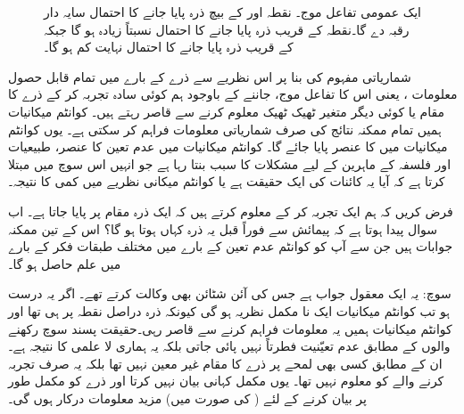 \begin{figure}
\centering
{}
\caption{
ایک عمومی تفاعل موج۔ نقطہ  اور  کے بیچ ذرہ پایا جانے کا احتمال سایہ دار رقبہ دے گا۔نقطہ  کے قریب ذرہ پایا جانے کا احتمال نسبتاً زیادہ ہو گا جبکہ  کے قریب ذرہ پایا جانے کا احتمال نہایت کم ہو گا۔
}
\label{شکل_تفاعل_موج_احتمال_اور_رقبہ}
\end{figure}
شماریاتی مفہوم کی بنا  پر اس نظریے سے  ذرے  کے بارے میں تمام قابل حصول معلومات ، یعنی اس کا تفاعل موج، جاننے  کے باوجود   ہم  کوئی سادہ تجربہ کر کے ذرے کا مقام یا کوئی دیگر متغیر ٹھیک ٹھیک معلوم کرنے سے قاصر رہتے ہیں۔ کوانٹم میکانیات ہمیں تمام ممکنہ نتائج کی  صرف شماریاتی معلومات فراہم کر سکتی ہے۔ یوں  کوانٹم میکانیات میں  کا عنصر پایا جائے گا۔ کوانٹم میکانیات میں عدم تعین کا عنصر،   طبیعیات اور فلسفہ کے ماہرین کے لیے مشکلات کا سبب بنتا رہا ہے جو انہیں اس سوچ   میں مبتلا کرتا  ہے  کہ آیا یہ کائنات کی ایک حقیقت ہے یا کوانٹم میکانی نظریے  میں کمی کا نتیجہ۔

 فرض کریں کہ ہم ایک تجربہ کر کے  معلوم کرتے ہیں کہ ایک ذرہ مقام  پر پایا جاتا ہے۔ اب سوال پیدا ہوتا ہے کہ پیمائش سے فوراً قبل یہ ذرہ کہاں ہوتا ہو گا؟ اس کے تین ممکنہ  جوابات ہیں جن سے آپ کو کوانٹم عدم تعین کے بارے میں مختلف طبقات فکر کے     بارے میں علم حاصل  ہو گا۔ 

\quad {}
 سوچ:    یہ ایک معقول جواب ہے جس کی آئن شٹائن بھی وکالت کرتے تھے۔ اگر یہ درست ہو تب کوانٹم میکانیات ایک نا مکمل نظریہ ہو گی کیونکہ ذرہ دراصل نقطہ  پر ہی تھا اور کوانٹم میکانیات ہمیں یہ معلومات فراہم کرنے سے قاصر رہی۔حقیقت پسند سوچ رکھنے  والوں کے مطابق عدم تعیّنیت   فطرتاً   نہیں پائی   جاتی  بلکہ  یہ ہماری لا علمی کا نتیجہ ہے۔ ان کے  مطابق  کسی بھی لمحے پر ذرے کا مقام غیر معین نہیں تھا بلکہ یہ صرف تجربہ کرنے والے کو معلوم نہیں تھا۔ یوں  مکمل کہانی بیان نہیں کرتا   اور ذرے کو مکمل طور پر بیان کرنے کے لئے ( کی صورت میں)  مزید معلومات درکار ہوں گی۔

